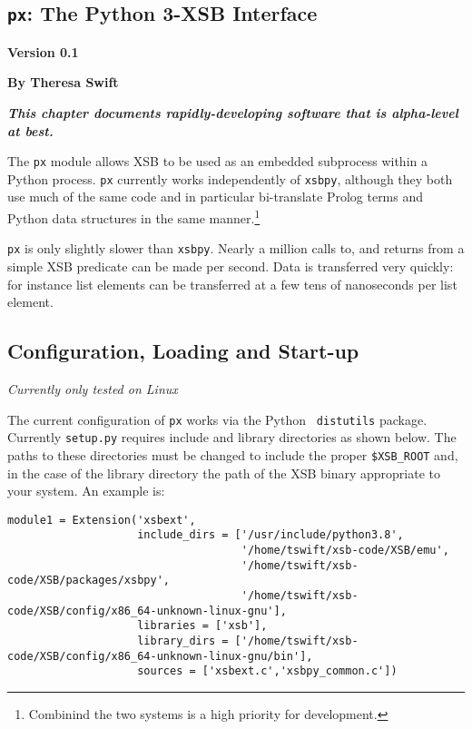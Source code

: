 
\newcommand{\pxversion}{Version 0.1}

\begin{center}
\chapter[Python and XSB]{{\tt px}: The Python 3-XSB Interface} \label{chap:px}
\end{center}

\vspace*{-.30in} 
\begin{center}
{\Large {\bf  \pxversion}}
\end{center}

\begin{center}
  {\Large {\bf By Theresa Swift}}
\end{center}

\noindent
{\large {\bf {\em This chapter documents rapidly-developing software that is alpha-level at best.}}}

The {\tt px} module allows XSB to be used as an embedded subprocess
within a Python process.  {\tt px} currently works independently of
{\tt xsbpy}, although they both use much of the same code and in
particular bi-translate Prolog terms and Python data structures in the
same manner.\footnote{Combinind the two systems is a high priority
  for development.}

{\tt px} is only slightly slower than {\tt xsbpy}.  Nearly a million
calls to, and returns from a simple XSB predicate can be made per
second.  Data is transferred very quickly: for instance list elements
can be transferred at a few tens of nanoseconds per list element.

\section{Configuration, Loading and Start-up}

{\em Currently only tested on Linux}

The current configuration of {\tt px} works via the Python {\tt
  distutils} package.  Currently {\tt setup.py} requires include and
library directories as shown below.  The paths to these directories
must be changed to include the proper {\tt \$XSB\_ROOT} and, in the
case of the library directory the path of the XSB binary appropriate
to your system.  An example is:

\begin{footnotesize}
  \begin{verbatim}
module1 = Extension('xsbext',
                    include_dirs = ['/usr/include/python3.8',
                                    '/home/tswift/xsb-code/XSB/emu',
                                    '/home/tswift/xsb-code/XSB/packages/xsbpy',
                                    '/home/tswift/xsb-code/XSB/config/x86_64-unknown-linux-gnu'],
                    libraries = ['xsb'],
                    library_dirs = ['/home/tswift/xsb-code/XSB/config/x86_64-unknown-linux-gnu/bin'],
                    sources = ['xsbext.c','xsbpy_common.c'])
  \end{verbatim}
\end{footnotesize}

